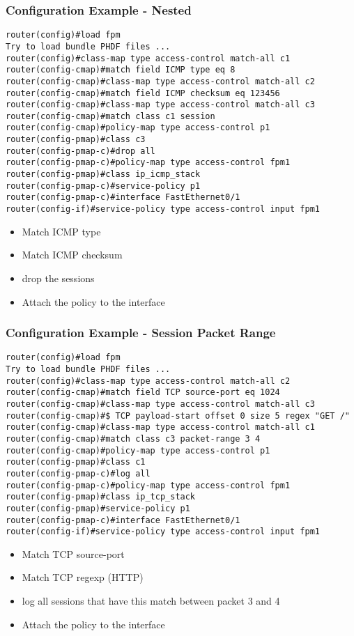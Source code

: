 \documentclass{beamer}
\begin{document}
\begin{frame}[fragile] \frametitle{Configuration Example - Nested}
\begin{lstlisting}[language=Terminal]
router(config)#load fpm
Try to load bundle PHDF files ...
router(config)#class-map type access-control match-all c1
router(config-cmap)#match field ICMP type eq 8
router(config-cmap)#class-map type access-control match-all c2
router(config-cmap)#match field ICMP checksum eq 123456
router(config-cmap)#class-map type access-control match-all c3
router(config-cmap)#match class c1 session
router(config-cmap)#policy-map type access-control p1
router(config-pmap)#class c3
router(config-pmap-c)#drop all
router(config-pmap-c)#policy-map type access-control fpm1
router(config-pmap)#class ip_icmp_stack
router(config-pmap-c)#service-policy p1
router(config-pmap-c)#interface FastEthernet0/1
router(config-if)#service-policy type access-control input fpm1
\end{lstlisting}
\begin{block}{}
\begin{itemize}
	\item Match ICMP type
    \item Match ICMP checksum
	\item drop the sessions
	\item Attach the policy to the interface
\end{itemize}
\end{block}
\end{frame}

\begin{frame}[fragile] \frametitle{Configuration Example - Session Packet Range}
\begin{lstlisting}[language=Terminal]
router(config)#load fpm
Try to load bundle PHDF files ...
router(config)#class-map type access-control match-all c2
router(config-cmap)#match field TCP source-port eq 1024
router(config-cmap)#class-map type access-control match-all c3
router(config-cmap)#$ TCP payload-start offset 0 size 5 regex "GET /"        
router(config-cmap)#class-map type access-control match-all c1
router(config-cmap)#match class c3 packet-range 3 4
router(config-cmap)#policy-map type access-control p1
router(config-pmap)#class c1
router(config-pmap-c)#log all
router(config-pmap-c)#policy-map type access-control fpm1
router(config-pmap)#class ip_tcp_stack
router(config-pmap)#service-policy p1
router(config-pmap-c)#interface FastEthernet0/1
router(config-if)#service-policy type access-control input fpm1
\end{lstlisting}
\begin{block}{}
\begin{itemize}
	\item Match TCP source-port
    \item Match TCP regexp (HTTP)
	\item log all sessions that have this match between packet 3 and 4
	\item Attach the policy to the interface
\end{itemize}
\end{block}
\end{frame}
\end{document}
